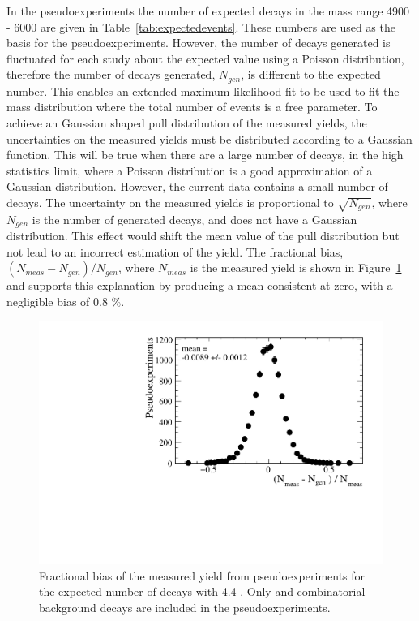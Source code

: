 In the pseudoexperiments the number of expected decays in the mass range 4900 - 6000 \mevcc are given in Table~\ref{tab:expectedevents}. These numbers are used as the basis for the pseudoexperiments. However, the number of decays generated is fluctuated for each study about the expected value using a Poisson distribution, therefore the number of decays generated, $N_{gen}$, is different to the expected number. This enables an extended maximum likelihood fit to be used to fit the mass distribution where the total number of events is a free parameter. To achieve an Gaussian shaped pull distribution of the measured \bsmumu yields, the uncertainties on the measured yields must be distributed according to a Gaussian function. This will be true when there are a large number of \bsmumu decays, in the high statistics limit, where a Poisson distribution is a good approximation of a Gaussian distribution. However, the current data contains a small number of \bsmumu decays. The uncertainty on the measured yields is proportional to $\sqrt{N_{gen}}$, where $N_{gen}$ is the number of generated decays, and does not have a Gaussian distribution. This effect would shift the mean value of the pull distribution but not lead to an incorrect estimation of the \bsmumu yield. The fractional bias, $(N_{meas} - N_{gen})/N_{gen}$, where $N_{meas}$ is the measured \bsmumu yield is shown in Figure~\ref{fig:FracBias} and supports this explanation by producing a mean consistent at zero, with a negligible bias of 0.8 $\%$. 

\begin{figure}[tbp]
    \centering
        \includegraphics[width=0.6 \textwidth]{./Figs/LifetimeSystematics/Fractional_bias_Bsmumu_yield_CKM.pdf}
    \caption{Fractional bias of the measured \bsmumu yield from pseudoexperiments for the expected number of decays with 4.4 \fb. Only \bsmumu and combinatorial background decays are included in the pseudoexperiments.}
    \label{fig:FracBias}
\end{figure}


